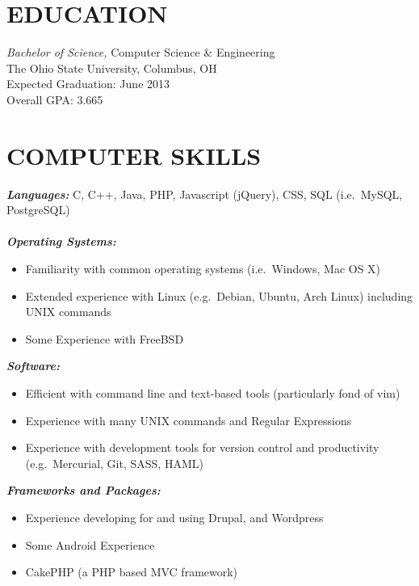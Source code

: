 \documentclass[line,margin=.2,letterpaper]{res}
\begin{document}
\fancyhead{}
\fancyfoot{}
\renewcommand{\headrulewidth}{0pt}
\address{2092 Middlesex road, Columbus, OH 43220}
\address{\href{mailto:ryan@ryanmcg.com}{ryan@ryanmcg.com} -- (614) 678-4408}
\begin{resume}
 
\section{\uppercase{Education}} {\sl Bachelor of Science,} Computer Science \& Engineering \\
		The Ohio State University, Columbus, OH \\
                Expected Graduation: June 2013 \\
		Overall GPA: 3.665 \\
 
\section{\uppercase{Computer Skills}}
	{\sl\textbf{Languages:}}
	    C, C++, Java, PHP, Javascript (jQuery), CSS, SQL (i.e.~MySQL, PostgreSQL) \\ \\
	{\sl\textbf{Operating Systems: }} \hfill 
	    \begin{itemize}
		\item Familiarity with common operating systems (i.e.~Windows, Mac OS X)
		\item Extended experience with Linux (e.g.~Debian, Ubuntu, Arch Linux) including UNIX commands
		\item Some Experience with FreeBSD
	    \end{itemize}
	{\sl\textbf{Software:}} \hfill 
	    \begin{itemize}
		\item Efficient with command line and text-based tools (particularly fond of vim)
		\item Experience with many UNIX commands and Regular Expressions
		\item Experience with development tools for version control and productivity (e.g.~Mercurial, Git, SASS, HAML)
	    \end{itemize}
	{\sl\textbf{Frameworks and Packages:}} \hfill 
	    \begin{itemize}
		\item Experience developing for and using Drupal, and Wordpress
		\item Some Android Experience
                \item CakePHP (a PHP based MVC framework)
	    \end{itemize}



\end{resume}
\end{document}
